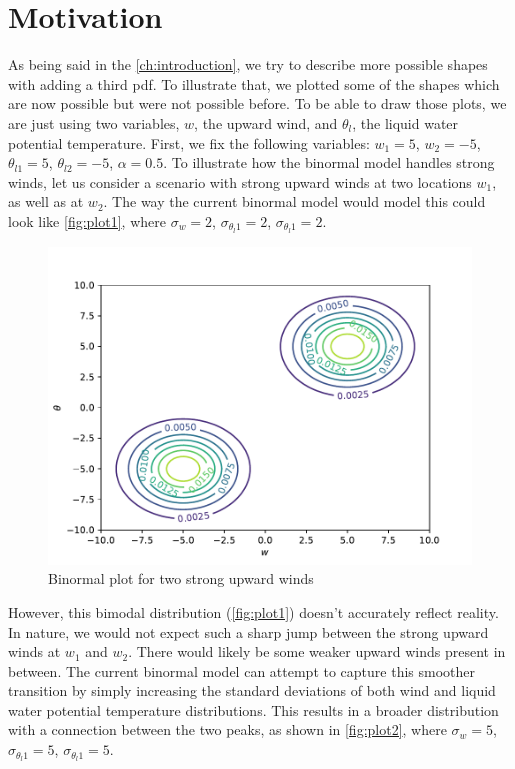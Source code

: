 \section{Motivation}\label{sec:motivation}

As being said in the \autoref{ch:introduction}, we try to describe more possible shapes with adding a third \gls{pdf}.
To illustrate that, we plotted some of the shapes which are now possible but were not possible before.
To be able to draw those plots, we are just using two variables, $w$, the upward wind, and $\theta_l$, the liquid water potential temperature.
First, we fix the following variables: $w_1 = 5$, $w_2 = -5$, $\theta_{l1} = 5$, $\theta_{l2} = -5$, $\alpha = 0.5$.
To illustrate how the binormal model handles strong winds, let us consider a scenario with strong upward winds at two locations $w_1$, as well as at $w_2$.
The way the current binormal model would model this could look like \autoref{fig:plot1}, where $\sigma_w = 2$, $\sigma_{\theta_l1} = 2$, $\sigma_{\theta_l1} = 2$.

\begin{figure}
    \centering
    \includegraphics[width=.5\textwidth]{include/figures/plot1}
    \caption{Binormal plot for two strong upward winds}
    \label{fig:plot1}
\end{figure}

However, this bimodal distribution (\autoref{fig:plot1}) doesn't accurately reflect reality.
In nature, we would not expect such a sharp jump between the strong upward winds at $w_1$ and $w_2$.
There would likely be some weaker upward winds present in between.
The current binormal model can attempt to capture this smoother transition by simply increasing the standard deviations of both wind and liquid water potential temperature distributions.
This results in a broader distribution with a connection between the two peaks, as shown in \autoref{fig:plot2}, where $\sigma_w = 5$, $\sigma_{\theta_l1} = 5$, $\sigma_{\theta_l1} = 5$.


